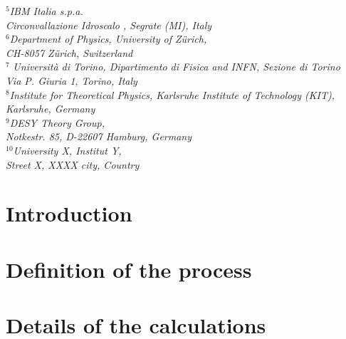 \documentclass[11pt,epsf]{article}
\begin{document}
{{\small\it
$^{5}$IBM Italia s.p.a.} \\ %
{\small\it Circonvallazione Idroscalo ,  Segrate (MI), %
        Italy}\\[3mm]
{\small\it
$^6$Department of Physics, University of Z\"urich,} \\ %
{\small\it CH-8057
Z\"urich, Switzerland}\\[3mm]
$^7${\small\it
Universit\`a di Torino, Dipartimento di Fisica and INFN, Sezione di Torino } \\ %
{\small\it Via P. Giuria 1,  Torino, %
        Italy}\\[3mm]
{\small\it
$^8$Institute for Theoretical Physics, Karlsruhe Institute of
Technology (KIT),} \\ %
{\small\it Karlsruhe, Germany}\\[3mm]
{\small\it
$^9$DESY Theory Group,} \\ %
{\small\it Notkestr. 85, \linebreak %
        D-22607 Hamburg, Germany}\\[3mm]
{\small\it
$^{10}$University X, %
        Institut Y,} \\ %
{\small\it Street X, \linebreak %
        XXXX city, %
        Country}\\[3mm]        
        }

\maketitle

\newpage



\section{Introduction}



\section{Definition of the process}
\label{sec:definition}



\section{Details of the calculations}
\label{sec:details}
\end{document}
